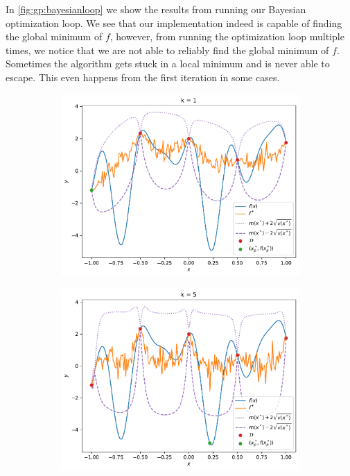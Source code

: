 In \cref{fig:gp:bayesianloop} we show the results from running our Bayesian optimization loop. We see that our implementation indeed is capable of finding the global minimum of $f$,
however, from running the optimization loop multiple times, we notice that we are not able to reliably find the global minimum of $f$. Sometimes the algorithm gets stuck in a local minimum and is never able to escape. This even happens from the first iteration in some cases.

\begin{figure}[H]
    \begin{subfigure}[t]{0.49\textwidth}
        \centering
        \includegraphics[width=\textwidth]{figures/gp/b2-k=1.pdf}
    \end{subfigure}
    \hfill
    \begin{subfigure}[t]{0.49\textwidth}
        \centering
        \includegraphics[width=\textwidth]{figures/gp/b2-k=5.pdf}
    \end{subfigure}


\end{figure}
